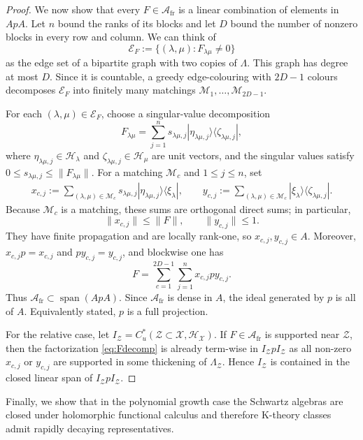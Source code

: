 \documentclass[12pt]{amsart}
\newcommand{\Hh}{{\mathcal H}}
\newcommand{\Xx}{{\mathcal X}}
\newcommand{\Zz}{{\mathcal Z}}
\begin{document}
\begin{proof}
We now show that every $F\in\mathcal A_{\mathrm{fr}}$ is a linear combination of elements in $ApA$.  Let
$n$ bound the ranks of its blocks and let $D$ bound the number of nonzero
blocks in every row and column.  We can think of
\[\mathcal E_F:=\{(\lambda,\mu):F_{\lambda\mu}\neq0\}\]
as the edge set of a bipartite graph with two copies of $\Lambda$.  This graph
has degree at most $D$.  Since it is countable, a greedy edge-colouring with
$2D-1$ colours decomposes $\mathcal E_F$ into finitely many matchings
$\mathcal M_1,\ldots,\mathcal M_{2D-1}$.

For each
$(\lambda,\mu)\in\mathcal E_F$, choose a singular-value decomposition
\[
F_{\lambda\mu} =\sum_{j=1}^n s_{\lambda\mu,j} |\eta_{\lambda\mu,j}\rangle \langle \zeta_{\lambda\mu,j}|,\]
where $\eta_{\lambda\mu,j}\in\Hh_\lambda$ and
$\zeta_{\lambda\mu,j}\in\Hh_\mu$ are unit vectors, and the singular values satisfy
$0\leq s_{\lambda\mu,j}\leq\|F_{\lambda\mu}\|$.  For a matching
$\mathcal M_c$ and $1\leq j\leq n$, set
\begin{align*}
 x_{c,j}:=\sum_{(\lambda,\mu)\in\mathcal M_c}
     s_{\lambda\mu,j}
    |\eta_{\lambda\mu,j}\rangle \langle \xi_\lambda|, \qquad
 y_{c,j}:=\sum_{(\lambda,\mu)\in\mathcal M_c}
     |\xi_\lambda\rangle \langle \zeta_{\lambda\mu,j}|.
\end{align*}
Because $\mathcal M_c$ is a matching, these sums
are orthogonal direct sums; in particular,
\[\|x_{c,j}\| \leq \|F\|, \qquad \|y_{c,j}\| \leq 1.\]
They have finite propagation and are locally rank-one, so
$x_{c,j},y_{c,j}\in A$.  Moreover, $x_{c,j}p=x_{c,j}$ and
$py_{c,j}=y_{c,j}$, and blockwise one has
\begin{equation}
\label{eq:Fdecomp}F=\sum_{c=1}^{2D-1}\sum_{j=1}^n x_{c,j}p y_{c,j}.
\end{equation}
Thus $\mathcal A_{\mathrm{fr}}\subset \operatorname{span}(ApA)$.  Since
$\mathcal A_{\mathrm{fr}}$ is dense in $A$, the ideal generated by $p$ is all
of $A$. Equivalently stated, $p$ is a full projection.

For the relative case, let $I_\Zz=C_u^*(\Zz\subset\Xx,\Hh_\Xx)$. If $F\in\mathcal A_{\mathrm{fr}}$ is supported near $\Zz$, then the factorization \eqref{eq:Fdecomp} is already term-wise in $I_\Zz p I_\Zz$ as all non-zero $x_{c,j}$ or $y_{c,j}$ are supported in some thickening of $\Lambda_\Zz$. Hence $I_\Zz$ is contained in the closed linear span of $I_\Zz p I_\Zz$.
\end{proof}

Finally, we show that in the polynomial growth case the Schwartz algebras are closed under holomorphic functional calculus and therefore K-theory classes admit rapidly decaying representatives. 
\end{document}
